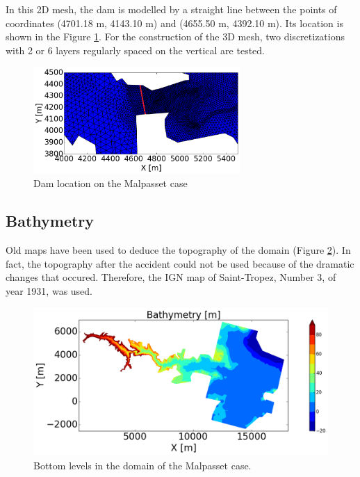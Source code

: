 In this 2D mesh, the dam is modelled by a straight line between the points of coordinates (4701.18 m, 4143.10 m) and (4655.50 m, 4392.10 m). Its location is shown in the Figure \ref{fig:malpasset:mesh_dam}.
For the construction of the 3D mesh, two discretizations with 2 or 6 layers regularly spaced on the
vertical are tested.
\begin{figure}[H] %
  \centering
  \includegraphics[width=0.7\textwidth]{img/Mesh_small_dam.png}
  \caption{Dam location on the Malpasset case}\label{fig:malpasset:mesh_dam}
\end{figure}

\subsection{Bathymetry}
Old maps have been used to deduce the topography of the domain (Figure \ref{fig:malpasset:bathy}).
In fact, the topography after the accident could not be used because of the dramatic changes
that occured. Therefore, the IGN map of Saint-Tropez, Number 3, of year 1931, was used.

\begin{figure}[H]
  \centering
  \includegraphics[width=1.0\textwidth]{img/bathymetry.png}
  \caption{Bottom levels in the domain of the Malpasset case.}\label{fig:malpasset:bathy}
\end{figure}

